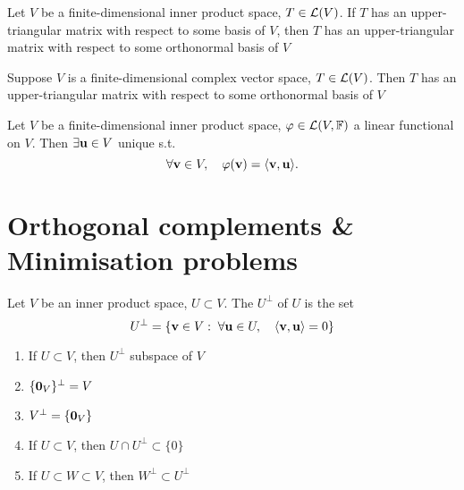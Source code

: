 \documentclass[aspectratio=169]{beamer}
\begin{document}
\begin{frame}
\begin{theorem}
Let $V$ be a finite-dimensional inner product space, $T\in\mathcal{L}(V)$. If $T$ has an upper-triangular matrix with respect to some basis of $V$, then $T$ has an upper-triangular matrix with respect to some orthonormal basis of $V$
\end{theorem}
\vfill
\begin{importanttheorem}
Suppose $V$ is a finite-dimensional complex vector space, $T\in\mathcal{L}(V)$. Then $T$ has an upper-triangular matrix with respect to some orthonormal basis of $V$
\end{importanttheorem}
\end{frame}


\begin{frame}
\begin{importanttheorem}
Let $V$ be a finite-dimensional inner product space, $\varphi\in\mathcal{L}(V,\mathbb{F})$ a linear functional on $V$. Then $\exists \mathbf{u}\in V$ unique s.t.
\[
\forall \mathbf{v}\in V,\quad \varphi(\mathbf{v})=\langle \mathbf{v},\mathbf{u}\rangle.
\]
\end{importanttheorem}
\end{frame}


\section{Orthogonal complements \& Minimisation problems}

\begin{frame}
\begin{definition}
Let $V$ be an inner product space, $U\subset V$. 
The  $U^\perp$ of $U$ is the set
\[
U^\perp =
\left\{
\mathbf{v}\in V: \;\forall \mathbf{u}\in U,\quad 
\langle\mathbf{v},\mathbf{u}\rangle =0
\right\}
\]
\end{definition}
\begin{importantproperty}
\begin{enumerate}
\item If $U\subset V$, then $U^\perp$ subspace of $V$
\item $\{\b0_V\}^\perp=V$
\item $V^\perp=\{\b0_V\}$
\item If $U\subset V$, then $U\cap U^\perp\subset\{0\}$
\item If $U\subset W\subset V$, then $W^\perp\subset U^\perp$
\end{enumerate}
\end{importantproperty}
\end{frame}
\end{document}
